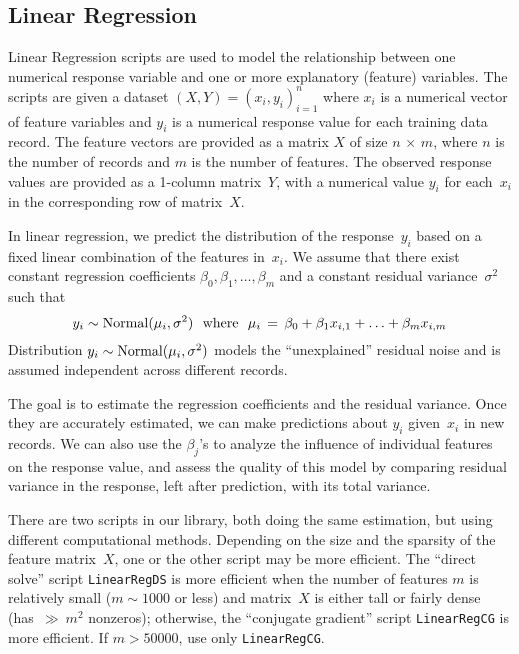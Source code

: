 \subsection{Linear Regression}
\label{sec:LinReg}

\smallskip

Linear Regression scripts are used to model the relationship between one numerical
response variable and one or more explanatory (feature) variables.
The scripts are given a dataset $(X, Y) = (x_i, y_i)_{i=1}^n$ where $x_i$ is a
numerical vector of feature variables and $y_i$ is a numerical response value for
each training data record.  The feature vectors are provided as a matrix $X$ of size
$n\,{\times}\,m$, where $n$ is the number of records and $m$ is the number of features.
The observed response values are provided as a 1-column matrix~$Y$, with a numerical
value $y_i$ for each~$x_i$ in the corresponding row of matrix~$X$.

In linear regression, we predict the distribution of the response~$y_i$ based on
a fixed linear combination of the features in~$x_i$.  We assume that
there exist constant regression coefficients $\beta_0, \beta_1, \ldots, \beta_m$
and a constant residual variance~$\sigma^2$ such that
\begin{equation}
y_i \sim \mathop{\mathrm{Normal}}\nolimits(\mu_i, \sigma^2) \,\,\,\,\textrm{where}\,\,\,\,
\mu_i \,=\, \beta_0 + \beta_1 x_{i,1} + \ldots + \beta_m x_{i,m}
\label{eqn:linregdef}
\end{equation}
Distribution $y_i \sim \mathop{\mathrm{Normal}}\nolimits(\mu_i, \sigma^2)$ models the ``unexplained'' residual
noise and is assumed independent across different records.

The goal is to estimate the regression coefficients and the residual variance.
Once they are accurately estimated, we can make predictions about $y_i$ given~$x_i$
in new records.  We can also use the $\beta_j$'s to analyze the influence of individual
features on the response value, and assess the quality of this model by comparing
residual variance in the response, left after prediction, with its total variance.

There are two scripts in our library, both doing the same estimation, but using different
computational methods.  Depending on the size and the sparsity of the feature matrix~$X$,
one or the other script may be more efficient.  The ``direct solve'' script
{\tt LinearRegDS} is more efficient when the number of features $m$ is relatively small
($m \sim 1000$ or less) and matrix~$X$ is either tall or fairly dense
(has~${\gg}\:m^2$ nonzeros); otherwise, the ``conjugate gradient'' script {\tt LinearRegCG}
is more efficient.  If $m > 50000$, use only {\tt LinearRegCG}.

